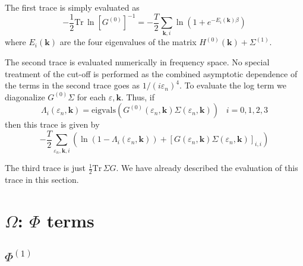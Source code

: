 The first trace is simply evaluated as
\begin{equation}
-\frac{1}{2} \mathrm{Tr}\, \ln [G^{(0)}]^{-1} = - \frac{T}{2} 
\sum_{\mathbf{k},i}
\ln(1  + e^{-E_i(\mathbf{k})\beta})
\end{equation}
where $E_i(\mathbf{k})$ are the four eigenvalues of
the matrix $H^{(0)}(\mathbf{k}) + \Sigma^{(1)}$.

The second trace is evaluated numerically in frequency space.
No special treatment of the cut-off is performed as
the combined asymptotic dependence
of the terms in the second trace
goes as $1 / (i \varepsilon_n)^4$.
To evaluate the log term we diagonalize $G^{(0)}\Sigma$ for
each $\varepsilon, \mathbf{k}$.  Thus, if
\begin{equation}
\Lambda_i(\varepsilon_n, \mathbf{k}) = 
\mathrm{eigvals}(G^{(0)}(\varepsilon_n,\mathbf{k})
\Sigma(\varepsilon_n,\mathbf{k}))\;\;\;i = 0,1,2,3
\end{equation}
then this trace is given by
\begin{equation}
-\frac{T}{2} \sum_{\varepsilon_n,\mathbf{k},i}
\left( \ln(1 - \Lambda_i(\varepsilon_n,\mathbf{k})) +
\left[G(\varepsilon_n,\mathbf{k})\Sigma(\varepsilon_n,\mathbf{k})
\right]_{i,i} \right)
\end{equation}

The third trace is just $\frac{1}{2}\mathrm{Tr}\,\Sigma G$.  We have
already described the evaluation of this trace in this
section.

\section{$\Omega$: $\Phi$ terms}

\subsection{$\Phi^{(1)}$}

